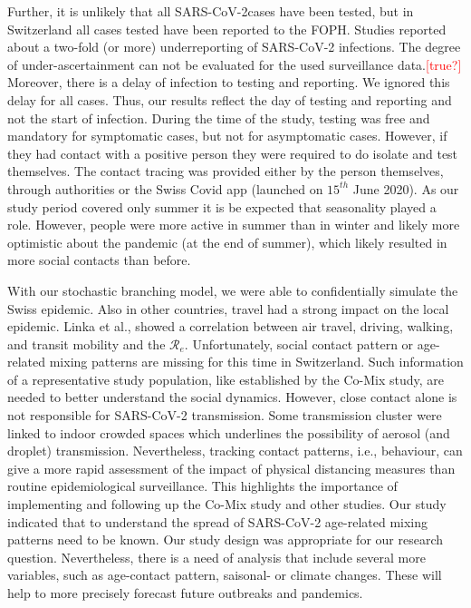 \documentclass[10pt, a4paper, twoside]{article}
\begin{document}
\begin{multicols}{2}
Further, it is unlikely that all SARS-CoV-2cases have been tested, but in Switzerland all cases tested have been reported to the FOPH.
Studies reported about a two-fold (or more) underreporting of SARS-CoV-2 infections.\cite{Li_substantial_2020,Wu_substantial_2020}
The degree of under-ascertainment can not be evaluated for the used surveillance data.\textcolor{red}{[true?]}
Moreover, there is a delay of infection to testing and reporting.
We ignored this delay for all cases.
Thus, our results reflect the day of testing and reporting and not the start of infection.
During the time of the study, testing was free and mandatory for symptomatic cases, but not for asymptomatic cases.
However, if they had contact with a positive person they were required to do isolate and test themselves. 
The contact tracing was provided either by the person themselves, through authorities or the Swiss Covid app (launched on $15^{th}$ June 2020).\cite{salath_early_2020}
As our study period covered only summer it is be expected that seasonality played a role.
However, people were more active in summer than in winter and likely more optimistic about the pandemic (at the end of summer), which likely resulted in more social contacts than before.

With our stochastic branching model, we were able to confidentially simulate the Swiss epidemic.
Also in other countries, travel had a strong impact on the local epidemic.\cite{russell_effect_2021,hodcroft_emergence_2020}
Linka et al., showed a correlation between air travel, driving, walking, and transit mobility and the $\mathcal{R}_e$.\cite{linka_reproduction_2020}
Unfortunately, social contact pattern or age-related mixing patterns are missing for this time in Switzerland.
Such information of a representative study population, like established by the Co-Mix study, are needed to better understand the social dynamics.\cite{coletti_comix_2020}
However, close contact alone is not responsible for SARS-CoV-2 transmission.
Some transmission cluster were linked to indoor crowded spaces which underlines the possibility of aerosol (and droplet) transmission.\cite{tang_aerosol_2020}
Nevertheless, tracking contact patterns, i.e., behaviour, can give a more rapid assessment of the impact of physical distancing measures than routine epidemiological surveillance.\cite{jarvis_quantifying_2020}
This highlights the importance of implementing and following up the Co-Mix study and other studies.
Our study indicated that to understand the spread of SARS-CoV-2  age-related mixing patterns need to be known.
Our study design was appropriate for our research question.
Nevertheless, there is a need of analysis that include several more variables, such as age-contact pattern, saisonal- or climate changes.
These will help to more precisely forecast future outbreaks and pandemics.


\end{multicols}
\end{document}
